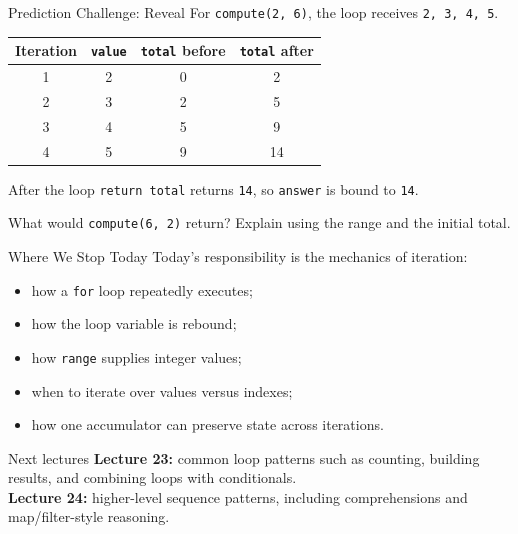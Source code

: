 \documentclass[aspectratio=169,10pt]{beamer}
\begin{document}
\begin{frame}{Prediction Challenge: Reveal}
  For \texttt{compute(2, 6)}, the loop receives \texttt{2, 3, 4, 5}.
  \begin{center}
    \renewcommand{\arraystretch}{1.35}
    \begin{tabular}{c|c|c|c}
      \textbf{Iteration} & \textbf{\texttt{value}} & \textbf{\texttt{total} before} & \textbf{\texttt{total} after} \\\hline
      1 & 2 & 0 & 2 \\
      2 & 3 & 2 & 5 \\
      3 & 4 & 5 & 9 \\
      4 & 5 & 9 & 14
    \end{tabular}
  \end{center}
  \begin{block}{After the loop}
    \texttt{return total} returns \texttt{14}, so \texttt{answer} is bound to \texttt{14}.
  \end{block}
  \begin{activity}
    What would \texttt{compute(6, 2)} return? Explain using the range and the initial total.
  \end{activity}
\end{frame}

\begin{frame}{Where We Stop Today}
  Today's responsibility is the mechanics of iteration:
  \begin{itemize}
    \item how a \texttt{for} loop repeatedly executes;
    \item how the loop variable is rebound;
    \item how \texttt{range} supplies integer values;
    \item when to iterate over values versus indexes;
    \item how one accumulator can preserve state across iterations.
  \end{itemize}

  \begin{alertblock}{Next lectures}
    \textbf{Lecture 23:} common loop patterns such as counting, building results, and combining loops with conditionals.\\[0.06in]
    \textbf{Lecture 24:} higher-level sequence patterns, including comprehensions and map/filter-style reasoning.
  \end{alertblock}
\end{frame}
\end{document}
